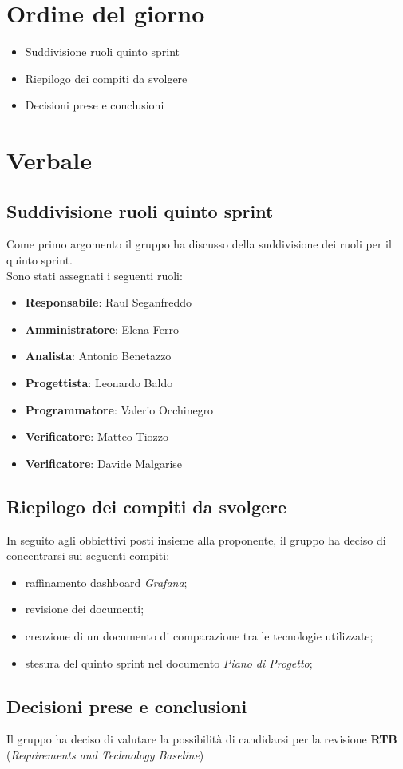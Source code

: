 \documentclass[italian,12pt]{article}
\begin{document}
\section{Ordine del giorno}

\begin{itemize}
	\item Suddivisione ruoli quinto sprint
	\item Riepilogo dei compiti da svolgere
	\item Decisioni prese e conclusioni
\end{itemize}


\newpage

\section{Verbale}

\subsection{Suddivisione ruoli quinto sprint}
Come primo argomento il gruppo ha discusso della suddivisione dei ruoli per il quinto sprint.\\
Sono stati assegnati i seguenti ruoli:
\begin{itemize}
	\item \textbf{Responsabile}: Raul Seganfreddo
	\item \textbf{Amministratore}: Elena Ferro
	\item \textbf{Analista}: Antonio Benetazzo
	\item \textbf{Progettista}: Leonardo Baldo
	\item \textbf{Programmatore}: Valerio Occhinegro
	\item \textbf{Verificatore}: Matteo Tiozzo
	\item \textbf{Verificatore}: Davide Malgarise
\end{itemize}

\subsection{Riepilogo dei compiti da svolgere}
In seguito agli obbiettivi posti insieme alla proponente, il gruppo ha deciso di concentrarsi sui seguenti compiti:
\begin{itemize}
	\item raffinamento dashboard \textit{Grafana};
	\item revisione dei documenti;
	\item creazione di un documento di comparazione tra le tecnologie utilizzate;
	\item stesura del quinto sprint nel documento \textit{Piano di Progetto};
\end{itemize}

\subsection{Decisioni prese e conclusioni}
Il gruppo ha deciso di valutare la possibilità di candidarsi per la revisione \textbf{RTB}
(\textit{Requirements and Technology Baseline})
\end{document}
